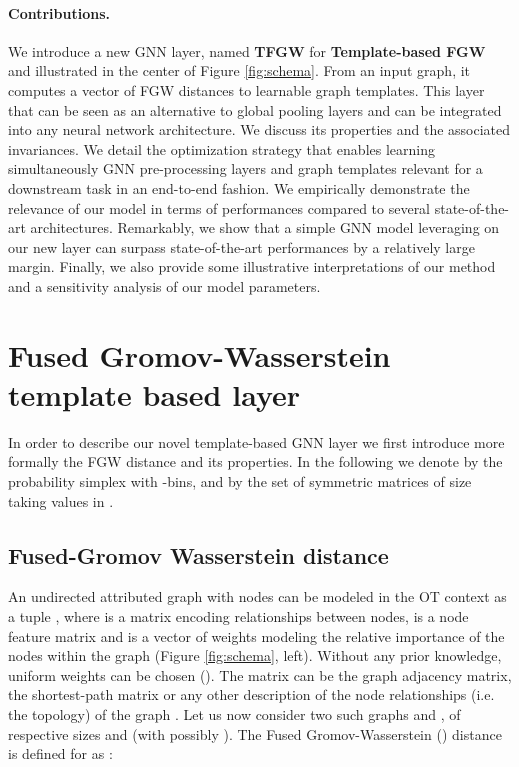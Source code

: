 \documentclass{article}
\begin{document}
\paragraph{Contributions.} We introduce a new GNN layer, named \textbf{TFGW} for
\textbf{Template-based FGW} and illustrated in the center of Figure \ref{fig:schema}. From
an input graph, it computes a vector of FGW distances to learnable graph
templates. This layer that can
be seen as an alternative to global pooling layers and can be
integrated into any neural network architecture.
We discuss its properties and the associated invariances. We detail the
optimization strategy that enables learning simultaneously GNN pre-processing
layers and graph
templates relevant for a downstream task in an end-to-end fashion. We 
empirically demonstrate the relevance of our model in terms of performances
compared to several state-of-the-art architectures. Remarkably, we show
that a simple GNN model leveraging on our new layer can surpass state-of-the-art performances by a relatively large margin. Finally, we also provide some
illustrative interpretations of our method and a sensitivity analysis of our model parameters. 	\label{sec:intro}
	
	\section{Fused Gromov-Wasserstein template based layer}
	

In order to describe our novel template-based GNN layer we first introduce more formally the FGW distance and its properties. In the following we denote by  the probability simplex
with -bins, and by  the set of symmetric matrices of size 
taking values in .


\subsection{Fused-Gromov Wasserstein distance \label{subsec:FGW}} 

An undirected attributed graph  with  nodes can be modeled in
the OT context as a tuple , where  is a
matrix encoding relationships between nodes,  is a node feature matrix and  is a vector of
weights modeling the relative importance of the nodes within the graph (Figure
\ref{fig:schema}, left). Without any prior knowledge, uniform weights can be chosen
(). The matrix  can be the graph adjacency matrix,
the shortest-path matrix or any other description of the node relationships
(i.e. the topology) of the graph \cite{peyre2016gromov, vayer2020fused,
chowdhury2021generalized}. Let us now consider two such graphs 
and , of respective sizes 
and  (with possibly ). The Fused
Gromov-Wasserstein () distance is defined for  as
\cite{vayer2020fused, titouan2019optimal}:
\end{document}
